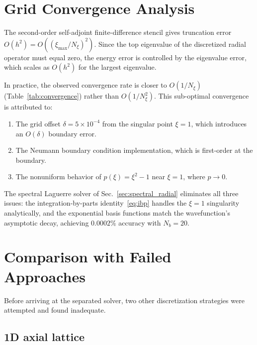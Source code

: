 \documentclass[aps,pra,twocolumn,superscriptaddress,longbibliography]{revtex4-2}
\begin{document}
\appendix

\section{Grid Convergence Analysis}
\label{app:convergence}

The second-order self-adjoint finite-difference stencil gives
truncation error $O(h^2) = O((\xi_{\max}/N_\xi)^2)$.  Since the
top eigenvalue of the discretized radial operator must equal zero,
the energy error is controlled by the eigenvalue error, which
scales as $O(h^2)$ for the largest eigenvalue.

In practice, the observed convergence rate is closer to $O(1/N_\xi)$
(Table~\ref{tab:convergence}) rather than $O(1/N_\xi^2)$.  This
sub-optimal convergence is attributed to:
\begin{enumerate}
  \item The grid offset $\delta = 5 \times 10^{-4}$ from the
    singular point $\xi = 1$, which introduces an $O(\delta)$
    boundary error.
  \item The Neumann boundary condition implementation, which is
    first-order at the boundary.
  \item The nonuniform behavior of $p(\xi) = \xi^2 - 1$ near
    $\xi = 1$, where $p \to 0$.
\end{enumerate}

The spectral Laguerre solver of Sec.~\ref{sec:spectral_radial}
eliminates all three issues: the integration-by-parts
identity~\eqref{eq:ibp} handles the $\xi = 1$ singularity
analytically, and the exponential basis functions match the
wavefunction's asymptotic decay, achieving $0.0002\%$ accuracy
with $N_b = 20$.


\section{Comparison with Failed Approaches}
\label{app:failed}

Before arriving at the separated solver, two other discretization
strategies were attempted and found inadequate.

\subsection{1D axial lattice}
\end{document}

